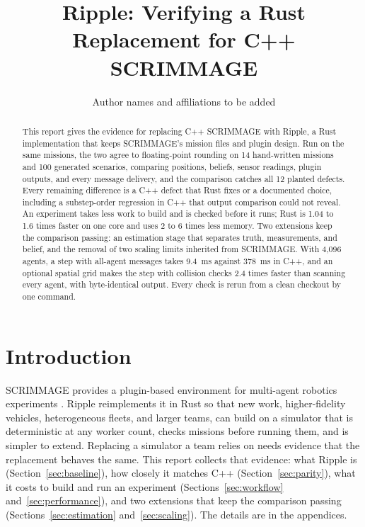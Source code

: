 \documentclass[conference]{IEEEtran}
\begin{document}
\title{Ripple: Verifying a Rust Replacement for C++ SCRIMMAGE}
\author{Author names and affiliations to be added}
\maketitle

\begin{abstract}
This report gives the evidence for replacing C++ SCRIMMAGE with Ripple, a
Rust implementation that keeps SCRIMMAGE's mission
files and plugin design.
Run on the same missions, the two agree to floating-point rounding on 14
hand-written missions and 100 generated scenarios, comparing positions,
beliefs, sensor readings, plugin outputs, and every message delivery, and the
comparison catches all 12 planted defects. Every remaining difference is a C++
defect that Rust fixes or a documented choice, including a substep-order
regression in C++ that output comparison could not reveal. An experiment takes
less work to build and is checked before it runs; Rust is 1.04 to 1.6 times
faster on one core and uses 2 to 6 times less memory. Two extensions keep the
comparison passing: an estimation stage that separates truth, measurements, and
belief, and the removal of two scaling limits inherited from SCRIMMAGE. With
4{,}096 agents, a step with all-agent messages takes 9.4~ms against
378~ms in C++, and an optional spatial grid makes the step with collision
checks 2.4 times faster than scanning every agent, with byte-identical output. Every check is rerun from a clean checkout by one command.
\end{abstract}

\IEEEpeerreviewmaketitle

\section{Introduction}

SCRIMMAGE provides a plugin-based environment for multi-agent robotics
experiments \cite{demarco2018}. Ripple reimplements it in Rust so that
new work, higher-fidelity vehicles, heterogeneous fleets, and larger teams,
can build on a simulator that is deterministic at any worker count, checks
missions before running them, and is simpler to extend. Replacing a simulator
a team relies on needs evidence that the replacement behaves the same. This
report collects that evidence: what Ripple is
(Section~\ref{sec:baseline}), how closely it matches C++
(Section~\ref{sec:parity}), what it costs to build and run an experiment
(Sections~\ref{sec:workflow} and~\ref{sec:performance}), and two extensions that
keep the comparison passing (Sections~\ref{sec:estimation}
and~\ref{sec:scaling}). The details are in the appendices.
\end{document}
